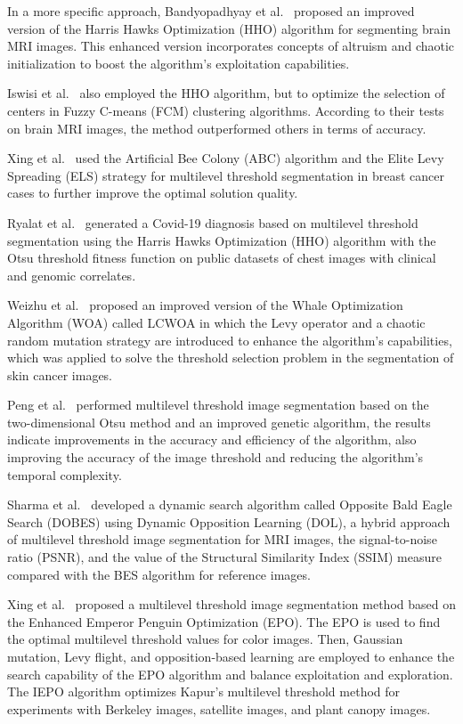 \documentclass{elsarticle}
\begin{document}
\noindent In a more specific approach, Bandyopadhyay et al.~\cite{Bandyopadhyay2021} proposed an improved version of the Harris Hawks Optimization (HHO) algorithm for segmenting brain MRI images. This enhanced version incorporates concepts of altruism and chaotic initialization to boost the algorithm’s exploitation capabilities.

\noindent Iswisi et al.~\cite{Iswisi2021} also employed the HHO algorithm, but to optimize the selection of centers in Fuzzy C-means (FCM) clustering algorithms. According to their tests on brain MRI images, the method outperformed others in terms of accuracy.

\noindent Xing et al.~\cite{Xing2023} used the Artificial Bee Colony (ABC) algorithm and the Elite Levy Spreading (ELS) strategy for multilevel threshold segmentation in breast cancer cases to further improve the optimal solution quality.

\noindent Ryalat et al.~\cite{Ryalat2022} generated a Covid-19 diagnosis based on multilevel threshold segmentation using the Harris Hawks Optimization (HHO) algorithm with the Otsu threshold fitness function on public datasets of chest images with clinical and genomic correlates.

\noindent Weizhu et al.~\cite{Weizhu2022} proposed an improved version of the Whale Optimization Algorithm (WOA) called LCWOA in which the Levy operator and a chaotic random mutation strategy are introduced to enhance the algorithm’s capabilities, which was applied to solve the threshold selection problem in the segmentation of skin cancer images.

\noindent Peng et al.~\cite{Peng2023} performed multilevel threshold image segmentation based on the two-dimensional Otsu method and an improved genetic algorithm, the results indicate improvements in the accuracy and efficiency of the algorithm, also improving the accuracy of the image threshold and reducing the algorithm’s temporal complexity.

\noindent Sharma et al.~\cite{Sharma2023} developed a dynamic search algorithm called Opposite Bald Eagle Search (DOBES) using Dynamic Opposition Learning (DOL), a hybrid approach of multilevel threshold image segmentation for MRI images, the signal-to-noise ratio (PSNR), and the value of the Structural Similarity Index (SSIM) measure compared with the BES algorithm for reference images.

\noindent Xing et al.~\cite{Xing2020} proposed a multilevel threshold image segmentation method based on the Enhanced Emperor Penguin Optimization (EPO). The EPO is used to find the optimal multilevel threshold values for color images. Then, Gaussian mutation, Levy flight, and opposition-based learning are employed to enhance the search capability of the EPO algorithm and balance exploitation and exploration. The IEPO algorithm optimizes Kapur's multilevel threshold method for experiments with Berkeley images, satellite images, and plant canopy images.
\end{document}
